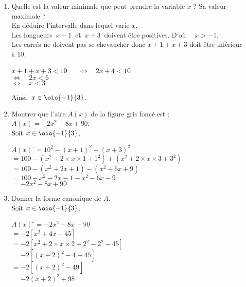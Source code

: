 \documentclass[a4paper,11pt,exos]{nsi}
\begin{document}
\begin{enumerate}
	\item 	\textcolor{UGLiBlue}{Quelle est la valeur minimale que peut prendre la variable $x$ ? Sa valeur maximale ?\\
    En déduire l'intervalle dans lequel varie $x$.}\\[.5em]
	Les longueurs $\ x+1\ $ et $\ x+3\ $ doivent être positives. D'où $\quad x>-1$.\\
	Les carrés ne doivent pas se chevaucher donc $x+1+x+3$ doit être inférieur à $10$.
	\begin{tabbing}
		$x+1+x+3<10 \quad$	\= $\iff \quad 2x+4<10$\\
		\>	$\iff \quad 2x<6$\\
		\>	$\iff \quad x<3$
	\end{tabbing}
	Ainsi $\ x\in\oio{-1}{3}$.
	
	\item 	\textcolor{UGLiBlue}{Montrer que l'aire $A(x)$ de la figure gris foncé est : $A(x)=-2x^2-8x+90$.}\\[.5em]
	Soit $x\in\oio{-1}{3}$.
	\begin{tabbing}
		$A(x)$	\=$=10^2-(x+1)^2-(x+3)^2$\\
		\>	$=100-(x^2+2\times x\times 1+1^2)+(x^2+2\times x\times 3+3^2)$\\
		\>	$= 100-(x^2+2x+1)-(x^2+6x+9)$\\
		\>	$=100-x^2-2x-1-x^2-6x-9$\\
		\>	$=-2x^2-8x+90$
	\end{tabbing}

	
    \item \textcolor{UGLiBlue}{Donner la forme canonique de $A$.}\\[.5em]
	Soit $x\in\oio{-1}{3}$.
	\begin{tabbing}
		$A(x)$	\=$=-2x^2-8x+90$\\
		\>	$=-2\left[x^2+4x-45\right]$\\
		\>	$=-2\left[x^2+2\times x\times 2+2^2-2^2-45\right]$\\
		\>	$=-2\left[(x+2)^2-4-45\right]$\\
		\>	$=-2\left[(x+2)^2-49\right]$\\
		\>	$=-2(x+2)^2+98$
	\end{tabbing}


\end{enumerate}
\end{document}
